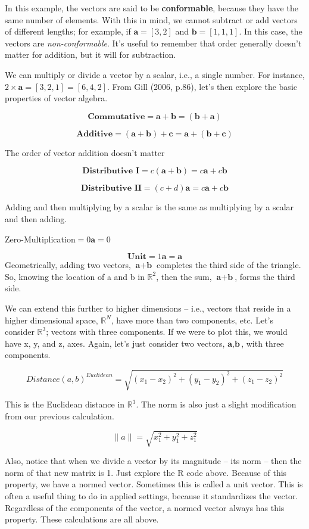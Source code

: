 \documentclass[
]{book}
\begin{document}
In this example, the vectors are said to be \textbf{conformable},
because they have the same number of elements.
With this in mind, we cannot subtract or add vectors of different lengths;
for example, if \(\textbf{a}=[3,2]\) and \(\textbf{b}=[1,1,1]\). In this
case, the vectors are \textit{non-conformable}. It's useful to
remember that order generally doesn't matter for addition, but it will
for subtraction.

We can multiply or divide a vector by a scalar, i.e., a single number.
For instance, \(2 \times \textbf{a}=[3,2,1]=[6,4,2]\). From Gill (2006,
p.86), let's then explore the basic properties of vector algebra.

\[\textbf{Commutative}=\textbf{a}+\textbf{b}=(\textbf{b}+\textbf{a})\]

\[\textbf{Additive}=(\textbf{a}+\textbf{b})+\textbf{c}=\textbf{a}+(\textbf{b}+\textbf{c})\]

The order of vector addition doesn't matter

\[\textbf{Distributive I}=c(\textbf{a}+\textbf{b})=c\textbf{a}+c\textbf{b}\]

\[\textbf{Distributive II}=(c+d)\textbf{a}= c\textbf{a}+c\textbf{b}\]

Adding and then multiplying by a scalar is the same as multiplying by a
scalar and then adding.

Zero-Multiplication\(=0\textbf{a}=0\)

\[\textbf{Unit}=1\textbf{a}=\textbf{a}\]Geometrically, adding two
vectors, \(\textbf{a}+\textbf{b}\) completes the third side of the
triangle. So, knowing the location of a and b in \(\mathbb{R}^{2}\), then the sum,
\(\textbf{a}+\textbf{b}\), forms the third side.

We can extend this further to higher dimensions -- i.e., vectors that
reside in a higher dimensional space, \(\mathbb{R}^{N}\), have more than two
components, etc. Let's consider \(\mathbb{R}^{3}\); vectors with three components.
If we were to plot this, we would have x, y, and z, axes. Again, let's
just consider two vectors, \(\textbf{a}, \textbf{b}\), with three
components.

\[Distance(a,b)^{Euclidean}=\sqrt{(x_1-x_2)^2+(y_1-y_2)^2+(z_1-z_2)^2}\]

This is the Euclidean distance in \(\mathbb{R}^3\). The norm is also just a slight
modification from our previous calculation.

\[\|a\|=\sqrt{x_1^2+y_1^2+z_1^2}\]

Also, notice that when we divide a vector by its magnitude -- its norm
-- then the norm of that new matrix is 1. Just explore the R code above.
Because of this property, we have a normed vector. Sometimes this is
called a unit vector. This is often a useful thing to do in applied
settings, because it standardizes the vector. Regardless of the
components of the vector, a normed vector always has this property.
These calculations are all above.
\end{document}
